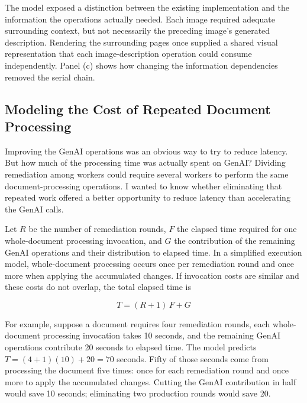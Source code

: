 The model exposed a distinction between the existing implementation and the information the operations actually needed. Each image required adequate surrounding context, but not necessarily the preceding image’s generated description. Rendering the surrounding pages once supplied a shared visual representation that each image-description operation could consume independently. Panel (c) shows how changing the information dependencies removed the serial chain.


\subsection{Modeling the Cost of Repeated Document Processing}\label{heading:the-second-resource-model}

Improving the GenAI operations was an obvious way to try to reduce latency. But how much of the processing time was actually spent on GenAI? Dividing remediation among workers could require several workers to perform the same document-processing operations. I wanted to know whether eliminating that repeated work offered a better opportunity to reduce latency than accelerating the GenAI calls.

Let \(R\) be the number of remediation rounds, \(F\) the elapsed time required for one whole-document processing invocation, and \(G\) the contribution of the remaining GenAI operations and their distribution to elapsed time. In a simplified execution model, whole-document processing occurs once per remediation round and once more when applying the accumulated changes. If invocation costs are similar and these costs do not overlap, the total elapsed time is

\[
T = (R+1)\,F + G
\]

For example, suppose a document requires four remediation rounds, each whole-document processing invocation takes 10 seconds, and the remaining GenAI operations contribute 20 seconds to elapsed time. The model predicts \(T = (4+1)(10) + 20 = 70\) seconds. Fifty of those seconds come from processing the document five times: once for each remediation round and once more to apply the accumulated changes. Cutting the GenAI contribution in half would save 10 seconds; eliminating two production rounds would save 20.

